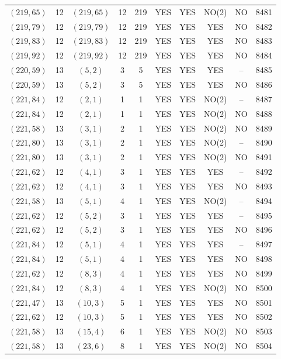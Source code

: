 \begin{longtable}{|c|c|c|c|c|c|c|c|c|c|}
$(219, 65)$ & 12 & $(219, 65)$ & 12 & 219 & YES & YES & NO(2) & NO & 8481\\
$(219, 79)$ & 12 & $(219, 79)$ & 12 & 219 & YES & YES & YES & NO & 8482\\
$(219, 83)$ & 12 & $(219, 83)$ & 12 & 219 & YES & YES & YES & NO & 8483\\
$(219, 92)$ & 12 & $(219, 92)$ & 12 & 219 & YES & YES & YES & NO & 8484\\
$(220, 59)$ & 13 & $(5, 2)$ & 3 & 5 & YES & YES & YES & -- & 8485\\
$(220, 59)$ & 13 & $(5, 2)$ & 3 & 5 & YES & YES & YES & NO & 8486\\
$(221, 84)$ & 12 & $(2, 1)$ & 1 & 1 & YES & YES & NO(2) & -- & 8487\\
$(221, 84)$ & 12 & $(2, 1)$ & 1 & 1 & YES & YES & NO(2) & NO & 8488\\
$(221, 58)$ & 13 & $(3, 1)$ & 2 & 1 & YES & YES & NO(2) & NO & 8489\\
$(221, 80)$ & 13 & $(3, 1)$ & 2 & 1 & YES & YES & NO(2) & -- & 8490\\
$(221, 80)$ & 13 & $(3, 1)$ & 2 & 1 & YES & YES & NO(2) & NO & 8491\\
$(221, 62)$ & 12 & $(4, 1)$ & 3 & 1 & YES & YES & YES & -- & 8492\\
$(221, 62)$ & 12 & $(4, 1)$ & 3 & 1 & YES & YES & YES & NO & 8493\\
$(221, 58)$ & 13 & $(5, 1)$ & 4 & 1 & YES & YES & NO(2) & -- & 8494\\
$(221, 62)$ & 12 & $(5, 2)$ & 3 & 1 & YES & YES & YES & -- & 8495\\
$(221, 62)$ & 12 & $(5, 2)$ & 3 & 1 & YES & YES & YES & NO & 8496\\
$(221, 84)$ & 12 & $(5, 1)$ & 4 & 1 & YES & YES & YES & -- & 8497\\
$(221, 84)$ & 12 & $(5, 1)$ & 4 & 1 & YES & YES & YES & NO & 8498\\
$(221, 62)$ & 12 & $(8, 3)$ & 4 & 1 & YES & YES & YES & NO & 8499\\
$(221, 84)$ & 12 & $(8, 3)$ & 4 & 1 & YES & YES & NO(2) & NO & 8500\\
$(221, 47)$ & 13 & $(10, 3)$ & 5 & 1 & YES & YES & YES & NO & 8501\\
$(221, 62)$ & 12 & $(10, 3)$ & 5 & 1 & YES & YES & YES & NO & 8502\\
$(221, 58)$ & 13 & $(15, 4)$ & 6 & 1 & YES & YES & NO(2) & NO & 8503\\
$(221, 58)$ & 13 & $(23, 6)$ & 8 & 1 & YES & YES & NO(2) & NO & 8504\\

\end{longtable}
